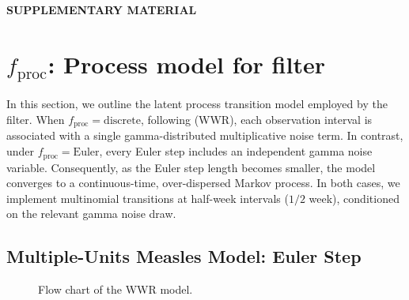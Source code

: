 \documentclass{article}
\newcommand\fproc{f_{\mathrm{proc}}}
\newcommand\fprocDiscrete{\mathrm{discrete}}
\newcommand\fprocEuler{\mathrm{Euler}}
\begin{document}
\setcounter{section}{0}
\renewcommand{\thesection}{S\arabic{section}}

\begin{center}
  {\Large \bf SUPPLEMENTARY MATERIAL}
\end{center}
\bigskip

\section{\texorpdfstring{$\fproc$}{fproc}: Process model for filter}

In this section, we outline the latent process transition model employed by the filter. 
When $\fproc = \fprocDiscrete$, following \citet{whitehouse23} (WWR), each observation interval is associated with a single gamma-distributed multiplicative noise term. 
In contrast, under $\fproc = \fprocEuler$, every Euler step includes an independent gamma noise variable. Consequently, as the Euler step length becomes smaller, the model converges to a continuous-time, over-dispersed Markov process. 
In both cases, we implement multinomial transitions at half-week intervals ($1/2$ week), conditioned on the relevant gamma noise draw.

\subsection*{Multiple-Units Measles Model: Euler Step}

\begin{figure}[htbp]
    \centering
    \caption{Flow chart of the WWR model.}
\end{figure}
\end{document}
